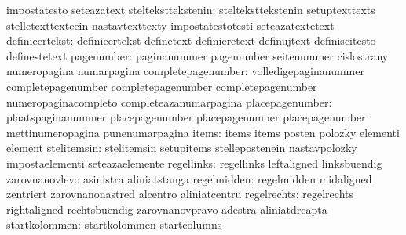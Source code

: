                                   impostatesto                     seteazatext
              stelteksttekstenin: stelteksttekstenin               setuptexttexts
                                  stelletexttexteein               nastavtexttexty
                                  impostatestotesti                seteazatextetext
                  definieertekst: definieertekst                   definetext
                                  definieretext                    definujtext
                                  definiscitesto                   definestetext
                      pagenumber: paginanummer                     pagenumber
                                  seitenummer                      cislostrany
                                  numeropagina                     numarpagina
              completepagenumber: volledigepaginanummer            completepagenumber
                                  completepagenumber               completepagenumber %
                                  numeropaginacompleto             completeazanumarpagina %
                 placepagenumber: plaatspaginanummer               placepagenumber
                                  placepagenumber                  placepagenumber %
                                  mettinumeropagina                punenumarpagina %
                           items: items                            items
                                  posten                           polozky
                                  elementi                         element
                     stelitemsin: stelitemsin                      setupitems
                                  stellepostenein                  nastavpolozky
                                  impostaelementi                  seteazaelemente
                      regellinks: regellinks                       leftaligned
                                  linksbuendig                     zarovnanovlevo
                                  asinistra                        aliniatstanga %
                     regelmidden: regelmidden                      midaligned
                                  zentriert                        zarovnanonastred
                                  alcentro                         aliniatcentru
                     regelrechts: regelrechts                      rightaligned
                                  rechtsbuendig                    zarovnanovpravo
                                  adestra                          aliniatdreapta
                   startkolommen: startkolommen                    startcolumns
